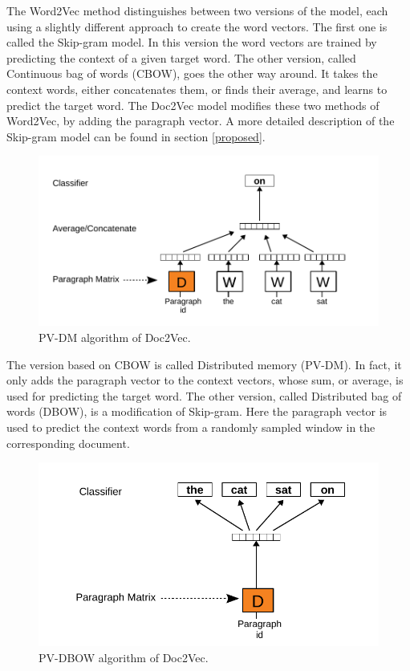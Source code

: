 The Word2Vec method distinguishes between two versions of the model, each using a slightly different approach to create the word vectors. The first one is called the Skip-gram model. In this version the word vectors are trained by predicting the context of a given target word. The other version, called Continuous bag of words (CBOW), goes the other way around. It takes the context words, either concatenates them, or finds their average, and learns to predict the target word. The Doc2Vec model modifies these two methods of Word2Vec, by adding the paragraph vector. A more detailed description of the Skip-gram model can be found in section \ref{proposed}.


\begin{figure}[H]
    \centering
    \includegraphics[scale=0.8]{obrazky-figures/pv-dm.pdf}
    \caption{PV-DM algorithm of Doc2Vec. \cite{Doc2Vec}}
\end{figure}

The version based on CBOW is called Distributed memory (PV-DM). In fact, it only adds the paragraph vector to the context vectors, whose sum, or average, is used for predicting the target word. The other version, called Distributed bag of words (DBOW), is a modification of Skip-gram. Here the paragraph vector is used to predict the context words from a randomly sampled window in the corresponding document.

\begin{figure}[H]
    \centering
    \includegraphics[scale=0.8]{obrazky-figures/pv-dbow.pdf}
    \caption{PV-DBOW algorithm of Doc2Vec. \cite{Doc2Vec}}
\end{figure}

